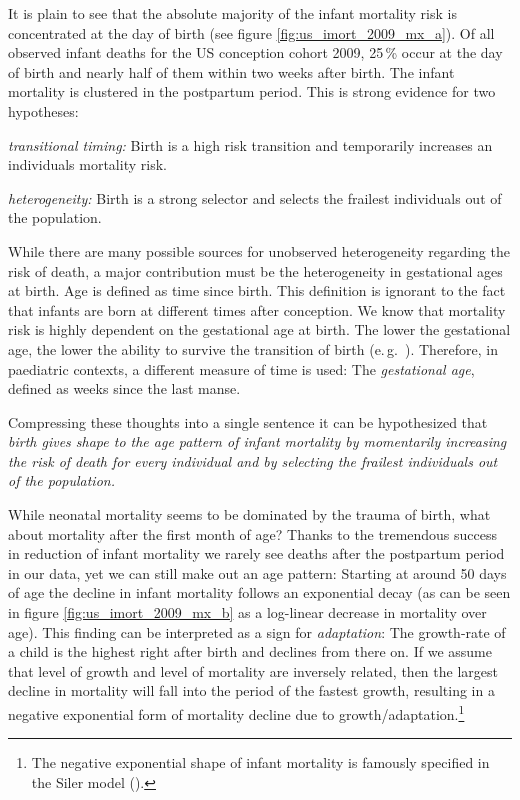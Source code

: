\documentclass[
  12pt
]{scrartcl}
\begin{document}
It is plain to see that the absolute majority of the infant mortality risk is concentrated at the day of birth (see figure \ref{fig:us_imort_2009_mx_a}). Of all observed infant deaths for the US conception cohort 2009, 25\,\% occur at the day of birth and nearly half of them within two weeks after birth. The infant mortality is clustered in the postpartum period. This is strong evidence for two hypotheses:
\begin{inparaenum}
  \item \emph{transitional timing:} Birth is a high risk transition and temporarily increases an individuals mortality risk.
  \item \emph{heterogeneity:} Birth is a strong selector and selects the frailest individuals out of the population.
\end{inparaenum}
While there are many possible sources for unobserved heterogeneity regarding the risk of death, a major contribution must be the heterogeneity in gestational ages at birth. Age is defined as time since birth. This definition is ignorant to the fact that infants are born at different times after conception. We know that mortality risk is highly dependent on the gestational age at birth. The lower the gestational age, the lower the ability to survive the transition of birth (e.\,g.~\cite{Lubchenco1972}). Therefore, in paediatric contexts, a different measure of time is used: The \emph{gestational age}, defined as weeks since the last manse.

Compressing these thoughts into a single sentence it can be hypothesized that \emph{birth gives shape to the age pattern of infant mortality by momentarily increasing the risk of death for every individual and by selecting the frailest individuals out of the population.}

While neonatal mortality seems to be dominated by the trauma of birth, what about mortality after the first month of age? Thanks to the tremendous success in reduction of infant mortality we rarely see deaths after the postpartum period in our data, yet we can still make out an age pattern: Starting at around 50 days of age the decline in infant mortality follows an exponential decay (as can be seen in figure \ref{fig:us_imort_2009_mx_b} as a log-linear decrease in mortality over age). This finding can be interpreted as a sign for \emph{adaptation}: The growth-rate of a child is the highest right after birth and declines from there on. If we assume that level of growth and level of mortality are inversely related, then the largest decline in mortality will fall into the period of the fastest growth, resulting in a negative exponential form of mortality decline due to growth/adaptation.\footnote{The negative exponential shape of infant mortality is famously specified in the Siler model (\cite{Siler1979}).}
\end{document}
